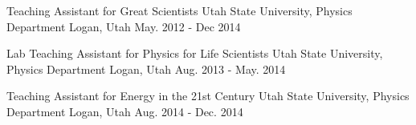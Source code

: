 


\begin{cventries}


\cventry
{Teaching Assistant for Great Scientists} %
{Utah State University, Physics Department} %
{Logan, Utah} %
{May. 2012 - Dec 2014} %
{ %
\begin{cvitems}
\end{cvitems}
}


\cventry
{Lab Teaching Assistant for Physics for Life Scientists } %
{Utah State University, Physics Department} %
{Logan, Utah} %
{Aug. 2013 - May. 2014} %
{ %
\begin{cvitems}
\end{cvitems}
}


\cventry
{Teaching Assistant for Energy in the 21st Century} %
{Utah State University, Physics Department} %
{Logan, Utah} %
{Aug. 2014 - Dec. 2014} %
{ %
\begin{cvitems}
\end{cvitems} 
}


\end{cventries}